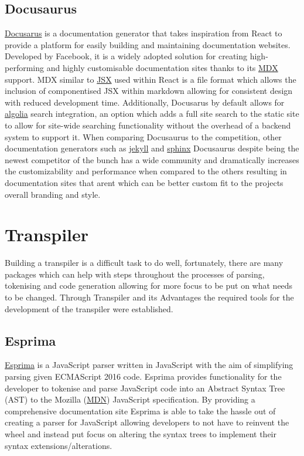 \documentclass{l4proj}
\begin{document}
\subsection{Docusaurus}
\href{https://docusaurus.io/}{Docusarus} is a documentation generator that takes inspiration from React to provide a platform for easily building and maintaining documentation websites. Developed by Facebook, it is a widely adopted solution for creating high-performing and highly customisable documentation sites thanks to its \href{https://mdxjs.com/}{MDX} support. MDX similar to \href{https://reactjs.org/docs/introducing-jsx.html}{JSX} used within React is a file format which allows the inclusion of componentised JSX within markdown allowing for consistent design with reduced development time. Additionally, Docusarus by default allows for \href{https://www.algolia.com/}{algolia} search integration, an option which adds a full site search to the static site to allow for site-wide searching functionality without the overhead of a backend system to support it. When comparing Docusaurus to the competition, other documentation generators such as \href{https://jekyllrb.com/}{jekyll} and \href{https://www.sphinx-doc.org/en/master/}{sphinx} Docusaurus despite being the newest competitor of the bunch has a wide community and dramatically increases the customizability and performance when compared to the others resulting in documentation sites that arent which can be better custom fit to the projects overall branding and style.


\section{Transpiler}

Building a transpiler is a difficult task to do well, fortunately, there are many packages which can help with steps throughout the processes of parsing, tokenising and code generation allowing for more focus to be put on what needs to be changed. Through Transpiler and its Advantages \cite{kulkarni2015transpiler} the required tools for the development of the transpiler were established.

\subsection{Esprima}
\href{https://esprima.org/}{Esprima} is a JavaScript parser written in JavaScript with the aim of simplifying parsing given ECMAScript 2016 code. Esprima provides functionality for the developer to tokenise and parse JavaScript code into an Abstract Syntax Tree (AST) to the Mozilla (\href{https://developer.mozilla.org/en-US/}{MDN}) JavaScript specification. By providing a comprehensive documentation site Esprima is able to take the hassle out of creating a parser for JavaScript allowing developers to not have to reinvent the wheel and instead put focus on altering the syntax trees to implement their syntax extensions/alterations. 
\end{document}

